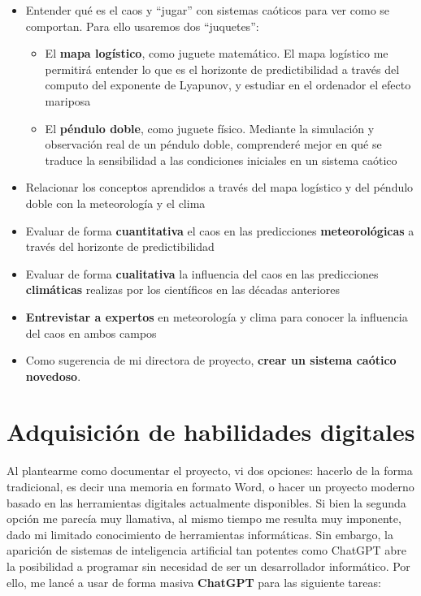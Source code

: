 \documentclass[
  10pt,
  a4paper,
  DIV=11,
  numbers=noendperiod,
  open=any]{scrreprt}
\providecommand{\tightlist}{%
  \setlength{\itemsep}{0pt}\setlength{\parskip}{0pt}}
\numberwithin{equation}{chapter}
\numberwithin{equation}{chapter}
\renewcommand{\[}{\begin{equation}}
\renewcommand{\]}{\end{equation}}
\begin{document}
\begin{itemize}
\item
  Entender qué es el caos y ``jugar'' con sistemas caóticos para ver
  como se comportan. Para ello usaremos dos ``juquetes'':

  \begin{itemize}
  \tightlist
  \item
    El \textbf{mapa logístico}, como juguete matemático. El mapa
    logístico me permitirá entender lo que es el horizonte de
    predictibilidad a través del computo del exponente de Lyapunov, y
    estudiar en el ordenador el efecto mariposa
  \item
    El \textbf{péndulo doble}, como juguete físico. Mediante la
    simulación y observación real de un péndulo doble, comprenderé mejor
    en qué se traduce la sensibilidad a las condiciones iniciales en un
    sistema caótico
  \end{itemize}
\item
  Relacionar los conceptos aprendidos a través del mapa logístico y del
  péndulo doble con la meteorología y el clima
\item
  Evaluar de forma \textbf{cuantitativa} el caos en las predicciones
  \textbf{meteorológicas} a través del horizonte de predictibilidad
\item
  Evaluar de forma \textbf{cualitativa} la influencia del caos en las
  predicciones \textbf{climáticas} realizas por los científicos en las
  décadas anteriores
\item
  \textbf{Entrevistar a expertos} en meteorología y clima para conocer
  la influencia del caos en ambos campos
\item
  Como sugerencia de mi directora de proyecto, \textbf{crear un sistema
  caótico novedoso}.
\end{itemize}

\section{Adquisición de habilidades
digitales}\label{adquisiciuxf3n-de-habilidades-digitales}

Al plantearme como documentar el proyecto, vi dos opciones: hacerlo de
la forma tradicional, es decir una memoria en formato Word, o hacer un
proyecto moderno basado en las herramientas digitales actualmente
disponibles. Si bien la segunda opción me parecía muy llamativa, al
mismo tiempo me resulta muy imponente, dado mi limitado conocimiento de
herramientas informáticas. Sin embargo, la aparición de sistemas de
inteligencia artificial tan potentes como ChatGPT abre la posibilidad a
programar sin necesidad de ser un desarrollador informático. Por ello,
me lancé a usar de forma masiva \textbf{ChatGPT} para las siguiente
tareas:
\end{document}
